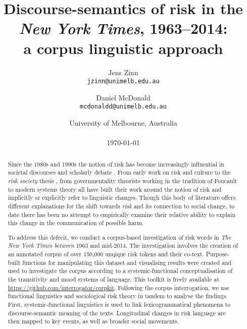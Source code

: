 \documentclass{report}
\title{Discourse-semantics of risk in the \emph{New York Times}, 1963--2014: \\ a corpus linguistic approach}
\author{
    Jens Zinn\\
    \texttt{jzinn@unimelb.edu.au}
    \and
    Daniel McDonald\\
    \texttt{mcdonaldd@unimelb.edu.au}\\
    }
\date{University of Melbourne, Australia\\
    ~\\
    \today}
\begin{document}
        

    \renewcommand{\abstractname}{Abstract}

    \maketitle

\begin{abstract}

    Since the 1980s and 1990s the notion of risk has become increasingly influential in societal discourses and scholarly debate \cite{skolbekken_risk_1995}. From early work on risk and culture \cite{douglas_risk_1986,douglas_risk_2013} to the \emph{risk society} thesis \cite{beck_risk_1992,beck_world_2009,giddens_runaway_2002}, from governmentality theorists working in the tradition of Foucault \cite{dean_governmentality:_2010,omalley_risk_2012,rose_powers_1999} to modern systems theory \cite{luhmann_ecological_1989,luhmann_communication_1993} all have built their work around the notion of risk and implicitly or explicitly refer to linguistic changes. Though this body of literature offers different explanations for the shift towards \emph{risk} and its connection to social change, to date there has been no attempt to empirically examine their relative ability to explain this change in the communication of possible harm. 


    To address this defecit, we conduct a corpus-based investigation of risk words in \emph{The New York Times between} 1963 and mid-2014. The investigation involves the creation of an annotated corpus of over 150,000 unqique risk tokens and their co-text. Purpose-built functions for manipulating this dataset and visualising results were created and used to investigate the corpus according to a systemic-functional conceptualisation of the transitivity and mood systems of language. This toolkit is freely available at \url{https://github.com/interrogator/corpkit}. Following the corpus interrogation, we use functional linguistics and sociological risk theory in tandem to analyse the findings. First, systemic-functional linguistics is used to link lexicogrammatical phenomena to discourse-semantic meaning of the texts. Longitudinal changes in risk language are then mapped to key events, as well as broader social movements.


\end{abstract}
\end{document}
